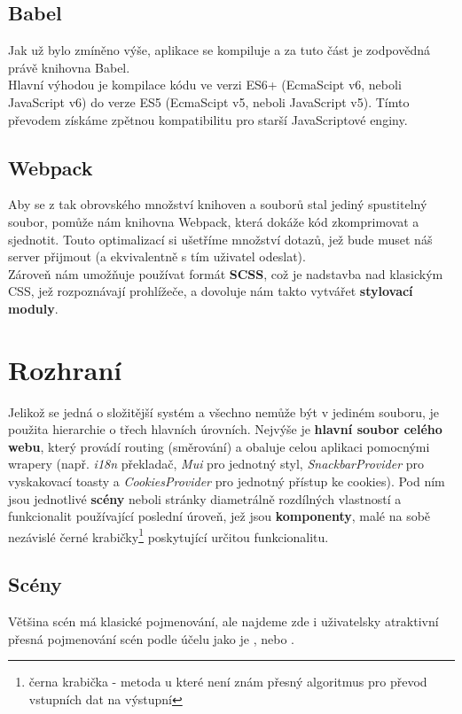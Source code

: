 \subsection{Babel}
Jak už bylo zmíněno výše, aplikace se kompiluje a za tuto část je zodpovědná právě knihovna Babel.\\
Hlavní výhodou je kompilace kódu ve verzi ES6+ (EcmaScipt v6, neboli JavaScript v6) do verze
ES5 (EcmaScipt v5, neboli JavaScript v5).
Tímto převodem získáme zpětnou kompatibilitu pro starší JavaScriptové enginy.

\subsection{Webpack}
Aby se z tak obrovského množství knihoven a souborů stal jediný spustitelný soubor, pomůže nám
knihovna Webpack, která dokáže kód zkomprimovat a sjednotit. Touto optimalizací si ušetříme
množství dotazů, jež bude muset náš server přijmout (a ekvivalentně s tím uživatel odeslat).\\
Zároveň nám umožňuje používat formát \textbf{SCSS}, což je nadstavba nad klasickým CSS, jež 
rozpoznávají prohlížeče, a dovoluje nám takto vytvářet \textbf{stylovací moduly}.

\section{Rozhraní}
Jelikož se jedná o složitější systém a všechno nemůže být  v jediném souboru, 
je použita hierarchie o třech hlavních úrovních. Nejvýše je \textbf{hlavní soubor celého webu}, který
provádí routing (směrování) a obaluje celou aplikaci pomocnými wrapery (např. \textit{i18n}
překladač, \textit{Mui} pro jednotný styl, \textit{SnackbarProvider} pro vyskakovací
toasty a \textit{CookiesProvider} pro jednotný přístup ke cookies). Pod ním jsou jednotlivé
\textbf{scény} neboli stránky diametrálně rozdílných vlastností a funkcionalit používající poslední
úroveň, jež jsou \textbf{komponenty}, malé na sobě nezávislé černé krabičky\footnote{černa krabička -
metoda u které není znám přesný algoritmus pro převod vstupních dat na výstupní}
poskytující určitou funkcionalitu.


\subsection{Scény}
Většina scén má klasické pojmenování, ale najdeme zde i uživatelsky atraktivní přesná
pojmenování scén podle účelu jako je ,  nebo .

